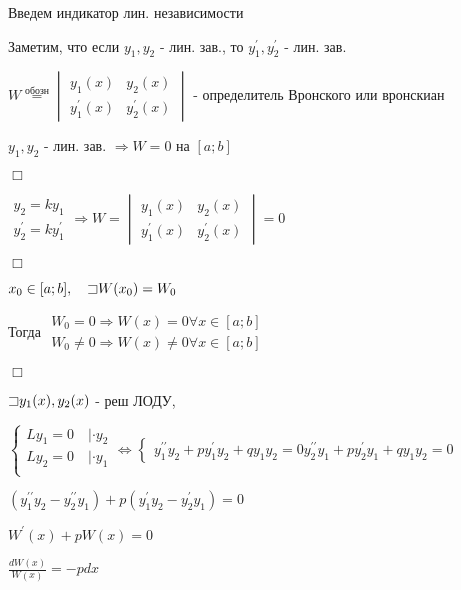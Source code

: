 \documentclass[12pt]{article}
\begin{document}
    Введем индикатор лин. независимости

    Заметим, что если $y_1, y_2$ - лин. зав., то $y_1^\prime, y_2^\prime$ - лин. зав.

    \Def $W \stackrel{\text{обозн}}{=} \begin{vmatrix}y_1(x) & y_2(x) \\ y_1^\prime(x) & y_2^\prime(x)\end{vmatrix}$ - определитель Вронского или вронскиан

     $y_1, y_2$ - лин. зав. $\Longrightarrow W = 0$ на $[a;b]$

    $\Box$

    $\begin{matrix}y_2 = k y_1 \\ y_2^\prime = k y_1^\prime\end{matrix} \Longrightarrow W = \begin{vmatrix}y_1(x) & y_2(x) \\ y_1^\prime(x) & y_2^\prime(x)\end{vmatrix} = 0$

    $\Box$

     $x_0 \in [a;b], \quad \mathord{\sqsupset} W(x_0) = W_0$

    Тогда $\begin{matrix}W_0 = 0 \Longrightarrow W(x) = 0 \forall x \in [a;b] \\
    W_0 \neq 0 \Longrightarrow W(x) \neq 0 \forall x \in [a;b]\end{matrix}$

    $\Box$

    $\mathord{\sqsupset} y_1(x), y_2(x)$ - реш ЛОДУ,

    $\begin{cases}
        Ly_1 = 0 \quad | \cdot y_2 \\
        Ly_2 = 0 \quad | \cdot y_1 \\
    \end{cases} \Longleftrightarrow
    \begin{cases}
        y_1^{\prime\prime} y_2 + py_1^{\prime} y_2 + q y_1 y_2 = 0
        y_2^{\prime\prime} y_1 + py_2^{\prime} y_1 + q y_1 y_2 = 0
    \end{cases}$

    $(y_1^{\prime\prime} y_2 - y_2^{\prime\prime} y_1) + p (y_1^{\prime} y_2 - y_2^{\prime} y_1) = 0$

    $W^\prime(x) + pW(x) = 0$

    $\frac{dW(x)}{W(x)} = -pdx$
\end{document}
